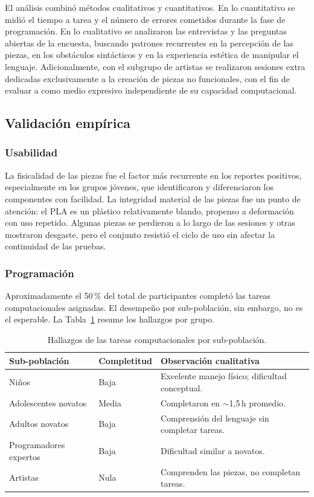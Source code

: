 El an\'alisis combin\'o m\'etodos cualitativos y cuantitativos.
En lo cuantitativo se midi\'o el tiempo a tarea y el n\'umero de
errores cometidos durante la fase de programaci\'on. En lo
cualitativo se analizaron las entrevistas y las preguntas abiertas
de la encuesta, buscando patrones recurrentes en la percepci\'on
de las piezas, en los obst\'aculos sint\'acticos y en la
experiencia est\'etica de manipular el lenguaje. Adicionalmente,
con el subgrupo de artistas se realizaron sesiones extra
dedicadas exclusivamente a la creaci\'on de piezas no funcionales,
con el fin de evaluar a \sculpt como medio expresivo independiente
de su capacidad computacional.

\subsection{Validaci\'on emp\'irica}
\label{sec:results:empiricalvalidation}

\subsubsection{Usabilidad}
La fisicalidad de las piezas fue el factor m\'as recurrente en los
reportes positivos, especialmente en los grupos j\'ovenes, que
identificaron y diferenciaron los componentes con facilidad. La
integridad material de las piezas fue un punto de atenci\'on: el PLA es
un pl\'astico relativamente blando, propenso a deformaci\'on con uso
repetido. Algunas piezas se perdieron a lo largo de las sesiones y
otras mostraron desgaste, pero el conjunto resisti\'o el ciclo de uso
sin afectar la continuidad de las pruebas.

\subsubsection{Programaci\'on}
Aproximadamente el 50\,\% del total de participantes complet\'o las
tareas computacionales asignadas. El desempe\~no por sub-poblaci\'on,
sin embargo, no es el esperable. La Tabla~\ref{tab:validation} resume los
hallazgos por grupo.

\begin{table}[h]
\centering
\small
\caption{Hallazgos de las tareas computacionales por sub-poblaci\'on.}
\label{tab:validation}
\begin{tabular}{@{}lll@{}}
\toprule
Sub-poblaci\'on & Completitud & Observaci\'on cualitativa \\
\midrule
Ni\~nos                 & Baja      & Excelente manejo f\'isico; dificultad conceptual. \\
Adolescentes novatos    & Media     & Completaron en $\sim$1{,}5\,h promedio. \\
Adultos novatos         & Baja      & Comprensi\'on del lenguaje sin completar tareas. \\
Programadores expertos  & Baja      & Dificultad similar a novatos. \\
Artistas                & Nula      & Comprenden las piezas, no completan tareas. \\
\bottomrule
\end{tabular}
\end{table}

